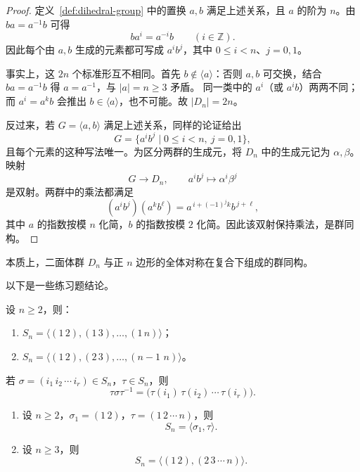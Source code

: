 \begin{proof}
定义~\ref{def:dihedral-group} 中的置换 $a,b$ 满足上述关系，且 $a$ 的阶为 $n$。由 $ba=a^{-1}b$ 可得
\[
  ba^i=a^{-i}b\qquad(i\in\mathbb Z).
\]
因此每个由 $a,b$ 生成的元素都可写成 $a^i b^j$，其中 $0\leq i<n$、$j=0,1$。

事实上，这 $2n$ 个标准形互不相同。首先 $b\notin\langle a\rangle$：否则 $a,b$ 可交换，结合 $ba=a^{-1}b$ 得 $a=a^{-1}$，与 $|a|=n\geq3$ 矛盾。
同一类中的 $a^i$（或 $a^i b$）两两不同；而 $a^i=a^k b$ 会推出 $b\in\langle a\rangle$，也不可能。故 $|D_n|=2n$。

反过来，若 $G=\langle a,b\rangle$ 满足上述关系，同样的论证给出
\[
  G=\{a^i b^j\mid 0\leq i<n,\ j=0,1\},
\]
且每个元素的这种写法唯一。为区分两群的生成元，将 $D_n$ 中的生成元记为 $\alpha,\beta$。映射
\[
  G\longrightarrow D_n,\qquad a^i b^j\longmapsto\alpha^i\beta^j
\]
是双射。两群中的乘法都满足
\[
  (a^i b^j)(a^k b^\ell)=a^{\,i+(-1)^j k}b^{\,j+\ell},
\]
其中 $a$ 的指数按模 $n$ 化简，$b$ 的指数按模 $2$ 化简。因此该双射保持乘法，是群同构。
\end{proof}

\begin{purplenote}
本质上，二面体群 $D_n$ 与正 $n$ 边形的全体对称在复合下组成的群同构。

以下是一些练习题结论。
\end{purplenote}

\begin{proposition}\label{prop:transposition-generating-sets}
设 $n\geq2$，则：
\begin{enumerate}[label=(\arabic*)]
  \item $S_n=\langle(1\,2),(1\,3),\ldots,(1\,n)\rangle$；
  \item $S_n=\langle(1\,2),(2\,3),\ldots,(n-1\,\,n)\rangle$。
\end{enumerate}
\end{proposition}

\begin{proposition}\label{prop:conjugation-of-cycle}
若 $\sigma=(i_1\,i_2\,\cdots\,i_r)\in S_n$，$\tau\in S_n$，则
\[
  \tau\sigma\tau^{-1}
  =\bigl(\tau(i_1)\,\tau(i_2)\,\cdots\,\tau(i_r)\bigr).
\]
\end{proposition}

\begin{proposition}\label{prop:two-generators-symmetric}
\begin{enumerate}[label=(\arabic*)]
  \item 设 $n\geq2$，$\sigma_1=(1\,2)$，$\tau=(1\,2\,\cdots\,n)$，则
  \[
    S_n=\langle\sigma_1,\tau\rangle.
  \]
  \item 设 $n\geq3$，则
  \[
    S_n=\langle(1\,2),(2\,3\,\cdots\,n)\rangle.
  \]
\end{enumerate}
\end{proposition}